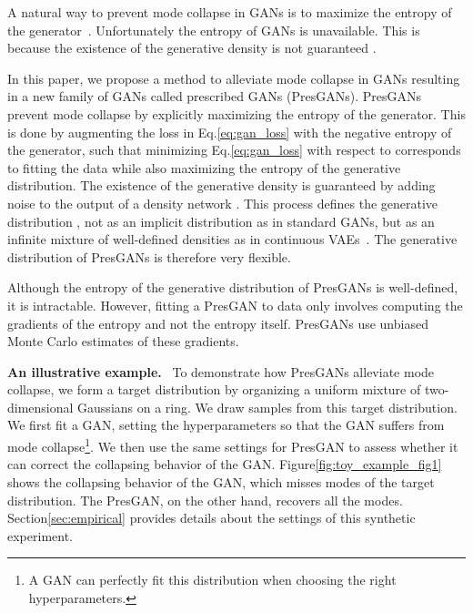 \documentclass[11pt]{article}
\DeclareRobustCommand{\parhead}[1]{\textbf{#1}~}
\begin{document}
A natural way to prevent mode collapse in \glspl{GAN} is to maximize the entropy of the generator~\citep{belghazi2018mine}. Unfortunately the entropy of \glspl{GAN} is unavailable.
This is because the existence of the generative density  is not guaranteed \citep{mohamed2016learning, arjovsky2017wasserstein}.

In this paper, we propose a method to alleviate mode collapse in \glspl{GAN} resulting in a new family of \glspl{GAN} called prescribed \glspl{GAN} (Pres\glspl{GAN}). Pres\glspl{GAN} prevent mode collapse by explicitly maximizing the entropy of the generator. This is done by augmenting the loss in Eq.\nobreakspace \ref {eq:gan_loss} with the negative entropy of the generator, such that minimizing Eq.\nobreakspace \ref {eq:gan_loss} with respect to  corresponds to fitting the data while also maximizing the entropy of the generative distribution. The existence of the generative density is guaranteed by adding noise to the output of a density network \citep{mackay1995bayesian, diggle1984monte}. This process defines the generative distribution , not as an implicit distribution as in standard \glspl{GAN}, but as an infinite mixture of well-defined densities as in continuous \glspl{VAE}~\citep{kingma2013auto, rezende2014stochastic}. The generative distribution of Pres\glspl{GAN} is therefore very flexible. 

Although the entropy of the generative distribution of Pres\glspl{GAN} is well-defined, it is intractable. However, fitting a Pres\gls{GAN} to data only involves computing the gradients of the entropy and not the entropy itself. Pres\glspl{GAN} use unbiased Monte Carlo estimates of these gradients. 

\parhead{An illustrative example.}
To demonstrate how Pres\glspl{GAN} alleviate mode collapse, we form a target distribution by organizing a uniform mixture of  two-dimensional Gaussians on a ring. 
We draw  samples from this target distribution. We first fit a \gls{GAN}, setting the hyperparameters so that the \gls{GAN} suffers from mode collapse\footnote{A \gls{GAN} can perfectly fit this distribution when choosing the right hyperparameters.}. We then use the same settings for Pres\gls{GAN} to assess whether it can correct the collapsing behavior of the \gls{GAN}. Figure\nobreakspace \ref {fig:toy_example_fig1} 
shows the collapsing behavior of the \gls{GAN}, which misses  modes of the target distribution. The Pres\gls{GAN}, on the other hand, recovers all the modes. 
Section\nobreakspace \ref {sec:empirical} provides details about the settings of this synthetic experiment.
\end{document}
